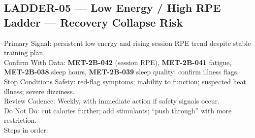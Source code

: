 \documentclass[10pt]{article}
\begin{document}
\newpage

\subsection*{LADDER-05 — Low Energy / High RPE Ladder — Recovery Collapse Risk}
{}

Primary Signal: persistent low energy and rising session RPE trend despite stable training plan.\\
Confirm With Data: \textbf{MET-2B-042} (session RPE), \textbf{MET-2B-041} fatigue, \textbf{MET-2B-038} sleep hours, \textbf{MET-2B-039} sleep quality; confirm illness flags.\\
Stop Conditions Safety: red-flag symptoms; inability to function; suspected heat illness; severe dizziness.\\
Review Cadence: Weekly, with immediate action if safety signals occur.\\
Do Not Do: cut calories further; add stimulants; “push through” with more restriction.\\
Steps in order:
\end{document}
